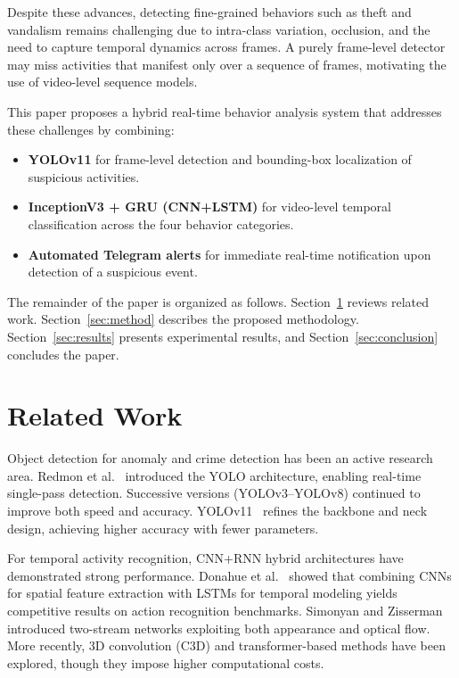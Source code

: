 \documentclass[runningheads]{llncs}
\begin{document}
Despite these advances, detecting fine-grained behaviors such as theft and vandalism remains challenging due to intra-class variation, occlusion, and the need to capture temporal dynamics across frames. A purely frame-level detector may miss activities that manifest only over a sequence of frames, motivating the use of video-level sequence models.

This paper proposes a hybrid real-time behavior analysis system that addresses these challenges by combining:
\begin{itemize}
    \item \textbf{YOLOv11} for frame-level detection and bounding-box localization of suspicious activities.
    \item \textbf{InceptionV3 + GRU (CNN+LSTM)} for video-level temporal classification across the four behavior categories.
    \item \textbf{Automated Telegram alerts} for immediate real-time notification upon detection of a suspicious event.
\end{itemize}

The remainder of the paper is organized as follows. Section~\ref{sec:related} reviews related work. Section~\ref{sec:method} describes the proposed methodology. Section~\ref{sec:results} presents experimental results, and Section~\ref{sec:conclusion} concludes the paper.

\section{Related Work}
\label{sec:related}

Object detection for anomaly and crime detection has been an active research area. Redmon et al.~\cite{redmon2016} introduced the YOLO architecture, enabling real-time single-pass detection. Successive versions (YOLOv3–YOLOv8) continued to improve both speed and accuracy. YOLOv11~\cite{khanam2024} refines the backbone and neck design, achieving higher accuracy with fewer parameters.

For temporal activity recognition, CNN+RNN hybrid architectures have demonstrated strong performance. Donahue et al.~\cite{donahue2015} showed that combining CNNs for spatial feature extraction with LSTMs for temporal modeling yields competitive results on action recognition benchmarks. Simonyan and Zisserman~\cite{simonyan2015} introduced two-stream networks exploiting both appearance and optical flow. More recently, 3D convolution (C3D) and transformer-based methods have been explored, though they impose higher computational costs.
\end{document}
